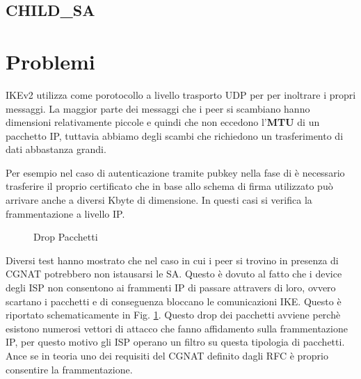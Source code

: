 \subsection{CHILD\_SA}


\section{Problemi}

IKEv2 utilizza come porotocollo a livello trasporto UDP per per inoltrare i propri messaggi. La maggior parte dei messaggi che i peer si scambiano hanno dimensioni relativamente piccole e
quindi che non eccedono l'\textbf{MTU} di un pacchetto IP, tuttavia abbiamo degli scambi che richiedono un trasferimento di dati abbastanza grandi.

Per esempio nel caso di autenticazione tramite pubkey nella fase di  è necessario trasferire il proprio certificato che in base allo schema di firma utilizzato
può arrivare anche a diversi Kbyte di dimensione. In questi casi si verifica la frammentazione a livello IP.


\begin{figure}[htbp]
    \centering
    \vspace*{1cm}
    \caption{Drop Pacchetti}
    \label{fig:cgnatdrop}
\end{figure}

Diversi test hanno mostrato che nel caso in cui i peer si trovino in presenza di CGNAT potrebbero non istausarsi le SA. Questo è dovuto al fatto che i device degli ISP non
consentono ai frammenti IP di passare attravers di loro, ovvero scartano i pacchetti e di conseguenza bloccano le comunicazioni IKE.
Questo è riportato schematicamente in Fig. \ref{fig:cgnatdrop}.
Questo drop dei pacchetti avviene perchè esistono numerosi vettori di attacco che fanno affidamento sulla frammentazione IP, per questo motivo gli ISP operano un filtro su questa tipologia di pacchetti.
Ance se in teoria uno dei requisiti del CGNAT definito dagli RFC è proprio consentire la frammentazione.

